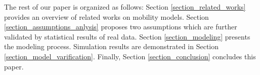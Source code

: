 The rest of our paper is organized as follows: Section \ref{section_related_works} provides an overview of related works on mobility models. Section \ref{section_assumptions_anlysis} proposes two assumptions which are further validated by statistical results of real data. Section \ref{section_modeling} presents the modeling process. Simulation results are demonstrated in Section \ref{section_model_varification}. Finally, Section \ref{section_conclusion} concludes this paper.

